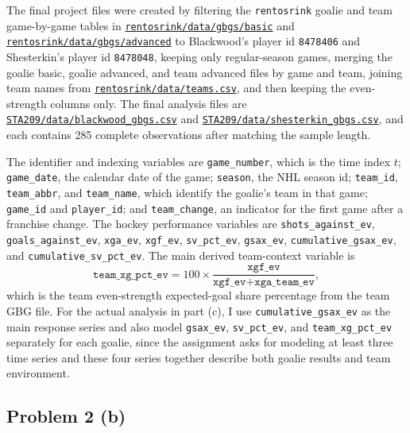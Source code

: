 \documentclass[
  10pt,
]{extarticle}
\begin{document}
The final project files were created by filtering the \texttt{rentosrink} goalie and team game-by-game tables in \href{https://github.com/RentoSaijo/rentosrink/tree/main/data/gbgs/basic}{\texttt{rentosrink/data/gbgs/basic}} and \href{https://github.com/RentoSaijo/rentosrink/tree/main/data/gbgs/advanced}{\texttt{rentosrink/data/gbgs/advanced}} to Blackwood's player id \texttt{8478406} and Shesterkin's player id \texttt{8478048}, keeping only regular-season games, merging the goalie basic, goalie advanced, and team advanced files by game and team, joining team names from \href{https://github.com/RentoSaijo/rentosrink/blob/main/data/teams.csv}{\texttt{rentosrink/data/teams.csv}}, and then keeping the even-strength columns only. The final analysis files are \href{https://github.com/RentoSaijo/STA209/blob/main/data/blackwood_gbgs.csv}{\texttt{STA209/data/blackwood\_gbgs.csv}} and \href{https://github.com/RentoSaijo/STA209/blob/main/data/shesterkin_gbgs.csv}{\texttt{STA209/data/shesterkin\_gbgs.csv}}, and each contains 285 complete observations after matching the sample length.

The identifier and indexing variables are \texttt{game\_number}, which is the time index \(t\); \texttt{game\_date}, the calendar date of the game; \texttt{season}, the NHL season id; \texttt{team\_id}, \texttt{team\_abbr}, and \texttt{team\_name}, which identify the goalie's team in that game; \texttt{game\_id} and \texttt{player\_id}; and \texttt{team\_change}, an indicator for the first game after a franchise change. The hockey performance variables are \texttt{shots\_against\_ev}, \texttt{goals\_against\_ev}, \texttt{xga\_ev}, \texttt{xgf\_ev}, \texttt{sv\_pct\_ev}, \texttt{gsax\_ev}, \texttt{cumulative\_gsax\_ev}, and \texttt{cumulative\_sv\_pct\_ev}. The main derived team-context variable is
\[
\texttt{team\_xg\_pct\_ev} = 100 \times \frac{\texttt{xgf\_ev}}{\texttt{xgf\_ev} + \texttt{xga\_team\_ev}},
\]
which is the team even-strength expected-goal share percentage from the team GBG file. For the actual analysis in part (c), I use \texttt{cumulative\_gsax\_ev} as the main response series and also model \texttt{gsax\_ev}, \texttt{sv\_pct\_ev}, and \texttt{team\_xg\_pct\_ev} separately for each goalie, since the assignment asks for modeling at least three time series and these four series together describe both goalie results and team environment.

\newpage

\subsection{Problem 2 (b)}\label{problem-2-b}
\end{document}
